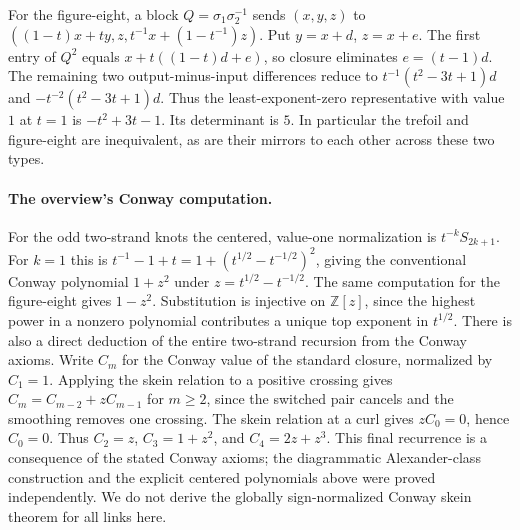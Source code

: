For the figure-eight, a block $Q=\sigma_1\sigma_2^{-1}$ sends $(x,y,z)$ to $((1-t)x+ty,z,t^{-1}x+(1-t^{-1})z)$. Put $y=x+d$, $z=x+e$. The first entry of $Q^2$ equals $x+t((1-t)d+e)$, so closure eliminates $e=(t-1)d$. The remaining two output-minus-input differences reduce to $t^{-1}(t^2-3t+1)d$ and $-t^{-2}(t^2-3t+1)d$. Thus the least-exponent-zero representative with value $1$ at $t=1$ is $-t^2+3t-1$. Its determinant is $5$. In particular the trefoil and figure-eight are inequivalent, as are their mirrors to each other across these two types.

\paragraph{The overview's Conway computation.}
For the odd two-strand knots the centered, value-one normalization is $t^{-k}S_{2k+1}$. For $k=1$ this is $t^{-1}-1+t=1+(t^{1/2}-t^{-1/2})^2$, giving the conventional Conway polynomial $1+z^2$ under $z=t^{1/2}-t^{-1/2}$. The same computation for the figure-eight gives $1-z^2$. Substitution is injective on $\mathbb Z[z]$, since the highest power in a nonzero polynomial contributes a unique top exponent in $t^{1/2}$. There is also a direct deduction of the entire two-strand recursion from the Conway axioms. Write $C_m$ for the Conway value of the standard closure, normalized by $C_1=1$. Applying the skein relation to a positive crossing gives $C_m=C_{m-2}+zC_{m-1}$ for $m\ge2$, since the switched pair cancels and the smoothing removes one crossing. The skein relation at a curl gives $zC_0=0$, hence $C_0=0$. Thus $C_2=z$, $C_3=1+z^2$, and $C_4=2z+z^3$. This final recurrence is a consequence of the stated Conway axioms; the diagrammatic Alexander-class construction and the explicit centered polynomials above were proved independently. We do not derive the globally sign-normalized Conway skein theorem for all links here.

